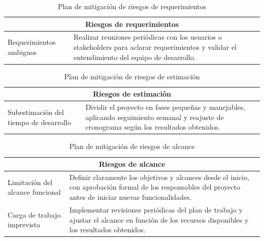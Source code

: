 \begin{table}[H]
	\centering
	\renewcommand{\arraystretch}{1.2}
	\setlength{\tabcolsep}{4pt}
	\begin{tabular}{|p{}|p{}|}
		\hline
		\multicolumn{2}{|c|}{\textbf{Riesgos de requerimientos}} \\ \hline
		Requerimientos ambiguos & Realizar reuniones periódicas con los usuarios o stakeholders para aclarar requerimientos y validar el entendimiento del equipo de desarrollo. \\ \hline
	\end{tabular}
	\caption{Plan de mitigación de riesgos de requerimientos}
	\label{table:mitigacion_requerimiento}
\end{table}

\begin{table}[H]
	\centering
	\renewcommand{\arraystretch}{1.2}
	\setlength{\tabcolsep}{4pt}
	\begin{tabular}{|p{}|p{}|}
		\hline
		\multicolumn{2}{|c|}{\textbf{Riesgos de estimación}} \\ \hline
		Subestimación del tiempo de desarrollo & Dividir el proyecto en fases pequeñas y manejables, aplicando seguimiento semanal y reajuste de cronograma según los resultados obtenidos. \\ \hline
	\end{tabular}
	\caption{Plan de mitigación de riesgos de estimación}
	\label{table:mitigacion_estimacion}
\end{table}

\begin{table}[H]
	\centering
	\renewcommand{\arraystretch}{1.2}
	\setlength{\tabcolsep}{4pt}
	\begin{tabular}{|p{}|p{}|}
		\hline
		\multicolumn{2}{|c|}{\textbf{Riesgos de alcance}} \\ \hline
		Limitación del alcance funcional & Definir claramente los objetivos y alcances desde el inicio, con aprobación formal de los responsables del proyecto antes de iniciar nuevas funcionalidades. \\ \hline
		Carga de trabajo imprevista & Implementar revisiones periódicas del plan de trabajo y ajustar el alcance en función de los recursos disponibles y los resultados obtenidos. \\ \hline
	\end{tabular}
	\caption{Plan de mitigación de riesgos de alcance}
	\label{table:mitigacion_alcance}
\end{table}

